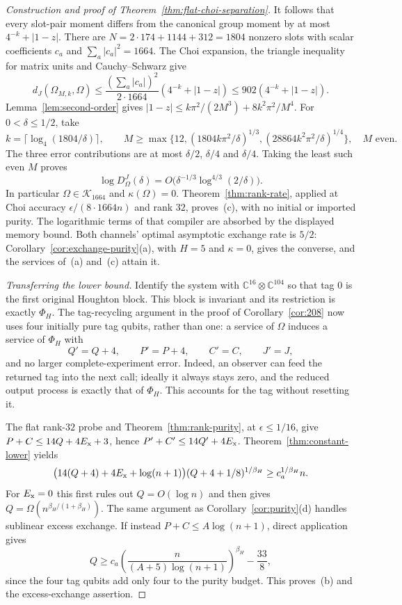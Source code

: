 \documentclass[11pt,a4paper]{article}
\theoremstyle{plain}
\theoremstyle{definition}
\theoremstyle{remark}
\newcommand{\DChoi}{D^{J}}
\newcommand{\dJ}{d_J}
\begin{document}
\begin{proof}[Construction and proof of Theorem~\ref{thm:flat-choi-separation}]
It follows that every slot-pair moment differs from the canonical group moment by at most $4^{-k}+|1-z|$. There are
$N=2\cdot174+1144+312=1804$ nonzero slots with scalar coefficients $c_a$ and $\sum_a|c_a|^2=1664$.
The Choi expansion, the triangle inequality for matrix units and Cauchy--Schwarz give
\[
\dJ(\Omega_{M,k},\Omega)\le\frac{(\sum_a|c_a|)^2}{2\cdot1664}(4^{-k}+|1-z|)
\le902(4^{-k}+|1-z|).
\]
Lemma~\ref{lem:second-order} gives $|1-z|\le k\pi^2/(2M^3)+8k^2\pi^2/M^4$. For $0<\delta\le1/2$, take
\[
k=\lceil\log_4(1804/\delta)\rceil,\qquad
M\ge\max\{12,(1804k\pi^2/\delta)^{1/3},(28864k^2\pi^2/\delta)^{1/4}\},\quad M\text{ even}.
\]
The three error contributions are at most $\delta/2$, $\delta/4$ and $\delta/4$. Taking the least such even $M$ proves
\begin{equation}\label{eq:flat-choi-profile}
\log\DChoi_\Omega(\delta)=O\big(\delta^{-1/3}\log^{4/3}(2/\delta)\big).
\end{equation}
In particular $\Omega\in\mathcal K_{1664}$ and $\kappa(\Omega)=0$. Theorem~\ref{thm:rank-rate}, applied at Choi accuracy
$\epsilon/(8\cdot1664n)$ and rank $32$, proves~(c), with no initial or imported purity. The logarithmic terms of that compiler are
absorbed by the displayed memory bound. Both channels' optimal asymptotic exchange rate is $5/2$: Corollary~\ref{cor:exchange-purity}(a),
with $H=5$ and $\kappa=0$, gives the converse, and the services of~(a) and~(c) attain it.

\emph{Transferring the lower bound.} Identify the system with $\mathbb C^{16}\otimes\mathbb C^{104}$ so that tag $0$ is the first original
Houghton block. This block is invariant and its restriction is exactly $\Phi_H$. The tag-recycling argument in the proof of
Corollary~\ref{cor:208} now uses four initially pure tag qubits, rather than one: a service of $\Omega$ induces a service of $\Phi_H$ with
\[
Q'=Q+4,\qquad P'=P+4,\qquad C'=C,\qquad J'=J,
\]
and no larger complete-experiment error. Indeed, an observer can feed the returned tag into the next call; ideally it always stays zero,
and the reduced output process is exactly that of $\Phi_H$. This accounts for the tag without resetting it.

The flat rank-$32$ probe and Theorem~\ref{thm:rank-purity}, at $\epsilon\le1/16$, give
$P+C\le14Q+4E_{\rm x}+3$, hence $P'+C'\le14Q'+4E_{\rm x}$. Theorem~\ref{thm:constant-lower} yields
\[
\big(14(Q+4)+4E_{\rm x}+\log(n+1)\big)(Q+4+1/8)^{1/\beta_H}\ge c_a^{1/\beta_H}n.
\]
For $E_{\rm x}=0$ this first rules out $Q=O(\log n)$ and then gives $Q=\Omega(n^{\beta_H/(1+\beta_H)})$.
The same argument as Corollary~\ref{cor:purity}(d) handles sublinear excess exchange. If instead $P+C\le A\log(n+1)$, direct application gives
\[
Q\ge c_a\left(\frac{n}{(A+5)\log(n+1)}\right)^{\beta_H}-\frac{33}{8},
\]
since the four tag qubits add only four to the purity budget. This proves~(b) and the excess-exchange assertion.
\end{proof}
\end{document}
